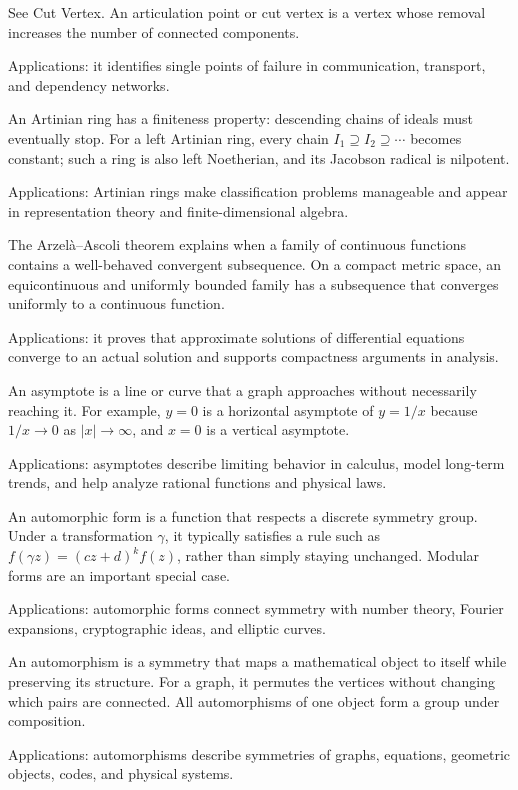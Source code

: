 See Cut Vertex. An articulation point or cut vertex is a vertex whose removal increases the number of connected components. \par\noindent Applications: it identifies single points of failure in communication, transport, and dependency networks.

An Artinian ring has a finiteness property: descending chains of ideals must eventually stop. For a left Artinian ring, every chain $I_1\supseteq I_2\supseteq\cdots$ becomes constant; such a ring is also left Noetherian, and its Jacobson radical is nilpotent. \par\noindent Applications: Artinian rings make classification problems manageable and appear in representation theory and finite-dimensional algebra.

The Arzelà--Ascoli theorem explains when a family of continuous functions contains a well-behaved convergent subsequence. On a compact metric space, an equicontinuous and uniformly bounded family has a subsequence that converges uniformly to a continuous function. \par\noindent Applications: it proves that approximate solutions of differential equations converge to an actual solution and supports compactness arguments in analysis.

An asymptote is a line or curve that a graph approaches without necessarily reaching it. For example, $y=0$ is a horizontal asymptote of $y=1/x$ because $1/x\to0$ as $|x|\to\infty$, and $x=0$ is a vertical asymptote. \par\noindent Applications: asymptotes describe limiting behavior in calculus, model long-term trends, and help analyze rational functions and physical laws.

An automorphic form is a function that respects a discrete symmetry group. Under a transformation $\gamma$, it typically satisfies a rule such as $f(\gamma z)=(cz+d)^k f(z)$, rather than simply staying unchanged. Modular forms are an important special case. \par\noindent Applications: automorphic forms connect symmetry with number theory, Fourier expansions, cryptographic ideas, and elliptic curves.

An automorphism is a symmetry that maps a mathematical object to itself while preserving its structure. For a graph, it permutes the vertices without changing which pairs are connected. All automorphisms of one object form a group under composition. \par\noindent Applications: automorphisms describe symmetries of graphs, equations, geometric objects, codes, and physical systems.

